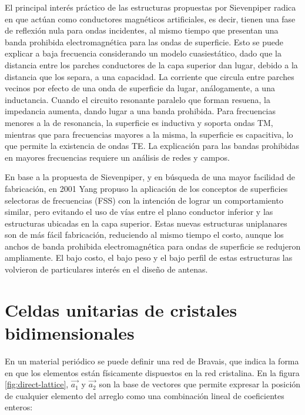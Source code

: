 El principal interés práctico de las estructuras propuestas por Sievenpiper radica en que actúan como conductores magnéticos artificiales, es decir, tienen una fase de reflexión nula para ondas incidentes, al mismo tiempo que presentan una banda prohibida electromagnética para las ondas de superficie. Esto se puede explicar a baja frecuencia considerando un modelo cuasiestático, dado que la distancia entre los parches conductores de la capa superior dan lugar, debido a la distancia que los separa, a una capacidad. La corriente que circula entre parches vecinos por efecto de una onda de superficie da lugar, análogamente, a una inductancia. Cuando el circuito resonante paralelo que forman resuena, la impedancia aumenta, dando lugar a una banda prohibida. Para frecuencias menores a la de resonancia, la superficie es inductiva y soporta ondas TM, mientras que para frecuencias mayores a la misma, la superficie es capacitiva, lo que permite la existencia de ondas TE. La explicación para las bandas prohibidas en mayores frecuencias requiere un análisis de redes y campos.

En base a la propuesta de Sievenpiper, y en búsqueda de una mayor facilidad de fabricación, en 2001 Yang propuso la aplicación de los conceptos de superficies selectoras de frecuencias (FSS) con la intención de lograr un comportamiento similar, pero evitando el uso de vías entre el plano conductor inferior y las estructuras ubicadas en la capa superior. Estas nuevas estructuras uniplanares son de más fácil fabricación, reduciendo al mismo tiempo el costo, aunque los anchos de banda prohibida electromagnética para ondas de superficie se redujeron ampliamente. El bajo costo, el bajo peso y el bajo perfil de estas estructuras las volvieron de particulares interés en el diseño de antenas.




\section{Celdas unitarias de cristales bidimensionales}
\label{sec:celdas-unitarias}
En un material periódico se puede definir una red de Bravais, que indica la forma en que los elementos están físicamente dispuestos en la red cristalina. En la figura \ref{fig:direct-lattice}, $\vec{a_1}$ y $\vec{a_2}$ son la base de vectores que permite expresar la posición de cualquier elemento del arreglo como una combinación lineal de coeficientes enteros:

